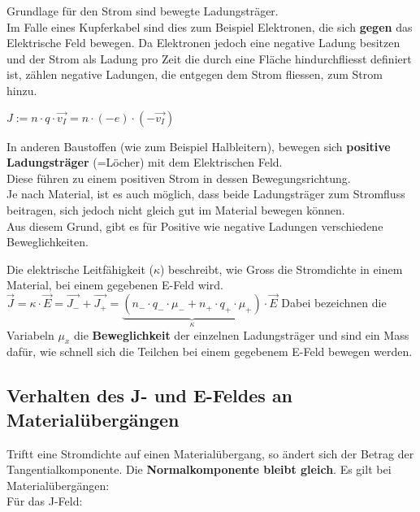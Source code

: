 					Grundlage für den Strom sind bewegte Ladungsträger. \\
					Im Falle eines Kupferkabel sind dies zum Beispiel Elektronen, die sich \textbf{gegen} das
					Elektrische Feld bewegen. Da Elektronen jedoch eine negative Ladung besitzen und der Strom als Ladung pro Zeit die durch eine Fläche hindurchfliesst definiert ist, zählen negative Ladungen, die entgegen dem Strom fliessen, zum Strom hinzu.

					\begin{center}
						$\displaystyle J := n \cdot q \cdot \vec{v_I} = n \cdot (-e) \cdot (-\vec{v_I}) $
					\end{center}

					In anderen Baustoffen (wie zum Beispiel Halbleitern), bewegen sich \textbf{positive Ladungsträger} (=Löcher) mit dem Elektrischen Feld. \\
					Diese führen zu einem positiven Strom in dessen Bewegungsrichtung. \\
					Je nach Material, ist es auch möglich, dass beide Ladungsträger zum Stromfluss beitragen, sich jedoch nicht gleich gut im Material bewegen können. \\
					Aus diesem Grund, gibt es für Positive wie negative Ladungen verschiedene Beweglichkeiten.

					\beginip
					Die elektrische Leitfähigkeit ($\kappa$) beschreibt, wie Gross die Stromdichte in einem Material, bei einem gegebenen E-Feld wird. \\
					\formulaBegin
					$\displaystyle \vec{J} = \kappa \cdot \vec{E} = \vec{J_{-}} + \vec{J_{+}} = \underbrace{(n_{-} \cdot q_{-} \cdot \mu_- + n_+ \cdot q_+ \cdot \mu_{+})}_{\kappa} \cdot \vec{E}$
					\formulaEnd
					Dabei bezeichnen die Variabeln $\mu_{x}$ die \textbf{Beweglichkeit} der einzelnen Ladungsträger und sind ein Mass dafür, wie schnell sich die Teilchen bei einem gegebenem E-Feld bewegen werden.
					\iend


					\subsection{Verhalten des J- und E-Feldes an Materialübergängen}
					Triftt eine Stromdichte auf einen Materialübergang, so ändert sich der Betrag der Tangentialkomponente. Die \textbf{Normalkomponente bleibt gleich}.
					\begingl
					Es gilt bei Materialübergängen: \\
					Für das J-Feld:
					\fspace
					\formulaBegin

